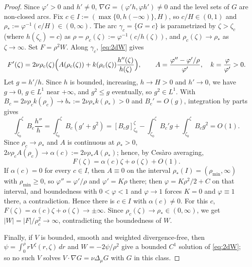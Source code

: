 \documentclass[11pt]{article}
\theoremstyle{definition}
\begin{document}
\begin{proof}
Since $\varphi'>0$ and $h'\ne0$, $\nabla G=(\varphi'h,\varphi h')\ne0$ and the
level sets of $G$ are non-closed arcs. Fix $c\in I:=(\max\{0,h(-\infty)\},H)$,
so $c/H\in(0,1)$ and $\rho_*:=\varphi^{-1}(c/H)\in(0,\infty)$. The arc
$\gamma_c=\{G=c\}$ is parametrized by $\zeta>\zeta_c$ (where $h(\zeta_c)=c$) as
$\rho=\rho_c(\zeta):=\varphi^{-1}(c/h(\zeta))$, and
$\rho_c(\zeta)\to\rho_*$ as $\zeta\to\infty$. Set $F=\rho^2W$. Along $\gamma_c$,
\eqref{eq:2dW} gives
\begin{equation}
F'(\zeta)=2\nu\rho_c(\zeta)\Bigl(A(\rho_c(\zeta))
+k(\rho_c(\zeta))\frac{h''(\zeta)}{h(\zeta)}\Bigr),\qquad
A=\frac{\varphi''-\varphi'/\rho}{\varphi'},\quad k=\frac{\varphi}{\varphi'}>0.
\end{equation}
Let $g=h'/h$. Since $h$ is bounded, increasing, $h\to H>0$ and $h'\to0$, we
have $g\to0$, $g\in L^1$ near $+\infty$, and $g^2\le g$ eventually, so
$g^2\in L^1$. With $B_c=2\nu\rho_c k(\rho_c)\to b_*:=2\nu\rho_*k(\rho_*)>0$ and
$B_c'=O(g)$, integration by parts gives
\begin{equation}
\int_{\zeta_0}^{\zeta}B_c\frac{h''}{h}
=\int_{\zeta_0}^{\zeta}B_c(g'+g^2)
=[B_cg]_{\zeta_0}^{\zeta}-\int_{\zeta_0}^{\zeta}B_c'g
+\int_{\zeta_0}^{\zeta}B_cg^2=O(1).
\end{equation}
Since $\rho_c\to\rho_*$ and $A$ is continuous at $\rho_*>0$,
$2\nu\rho_cA(\rho_c)\to\alpha(c):=2\nu\rho_*A(\rho_*)$; hence, by Ces\`aro
averaging,
\begin{equation}
F(\zeta)=\alpha(c)\zeta+o(\zeta)+O(1).
\end{equation}
If $\alpha(c)=0$ for every $c\in I$, then $A\equiv0$ on the interval
$\rho_*(I)=(\rho_{\min},\infty)$ with $\rho_{\min}\ge0$, so
$\varphi''=\varphi'/\rho$ and $\varphi'=K\rho$ there; then
$\varphi=K\rho^2/2+C$ on that interval, and boundedness with $0<\varphi<1$ and
$\varphi\to1$ forces $K=0$ and $\varphi\equiv1$ there, a contradiction. Hence
there is $c\in I$ with $\alpha(c)\ne0$. For this $c$,
$F(\zeta)=\alpha(c)\zeta+o(\zeta)\to\pm\infty$. Since
$\rho_c(\zeta)\to\rho_*\in(0,\infty)$, we get $|W|=|F|/\rho_c^2\to\infty$,
contradicting the boundedness of $W$.

Finally, if $V$ is bounded, smooth and weighted divergence-free, then
$\psi=\int_0^\rho rV^\zeta(r,\zeta)\,dr$ and $W=-2\psi/\rho^2$ give a bounded
$C^1$ solution of \eqref{eq:2dW}; so no such $V$ solves
$V\cdot\nabla G=\nu\Delta_\mu G$ with $G$ in this class.
\end{proof}
\end{document}
